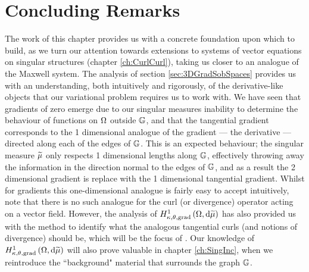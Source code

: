 \section{Concluding Remarks} \label{sec:Scalar-Conc}
The work of this chapter provides us with a concrete foundation upon which to build, as we turn our attention towards extensions to systems of vector equations on singular structures (chapter \ref{ch:CurlCurl}), taking us closer to an analogue of the Maxwell system.
The analysis of section \ref{sec:3DGradSobSpaces} provides us with an understanding, both intuitively and rigorously, of the derivative-like objects that our variational problem requires us to work with.
We have seen that gradients of zero emerge due to our singular measures inability to determine the behaviour of functions on $\Omega$ outside $\mathbb{G}$, and that the tangential gradient corresponds to the 1 dimensional analogue of the gradient --- the derivative --- directed along each of the edges of $\mathbb{G}$.
This is an expected behaviour; the singular measure $\widetilde{\mu}$ only respects 1 dimensional lengths along $\mathbb{G}$, effectively throwing away the information in the direction normal to the edges of $\mathbb{G}$, and as a result the 2 dimensional gradient is replace with the 1 dimensional tangential gradient.
Whilst for gradients this one-dimensional analogue is fairly easy to accept intuitively, note that there is no such analogue for the curl (or divergence) operator acting on a vector field.
However, the analysis of $H^1_{\kappa,\theta,\mathrm{grad}}\left( \Omega, \mathrm{d}\widetilde{\mu} \right)$ has also provided us with the method to identify what the analogous tangential curls (and notions of divergence) should be, which will be the focus of .
Our knowledge of $H^1_{\kappa,\theta,\mathrm{grad}}\left( \Omega, \mathrm{d}\widetilde{\mu} \right)$ will also prove valuable in chapter \ref{ch:SingInc}, when we reintroduce the ``background" material that surrounds the graph $\mathbb{G}$.

